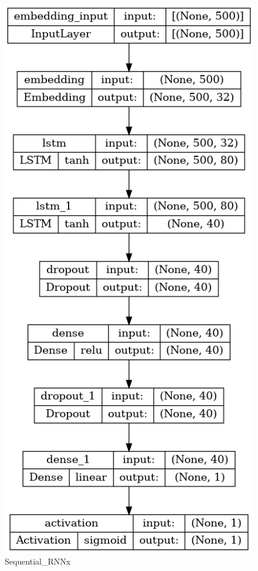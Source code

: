\begin{figure}[!ht]
\begin{minipage}{0.5\textwidth}
        \includegraphics[width=\linewidth]{obrazky-figures/model-plots/Sequential_RNNx.png} %
        \caption{Sequential\_RNNx}
    \end{minipage}
\end{figure}



